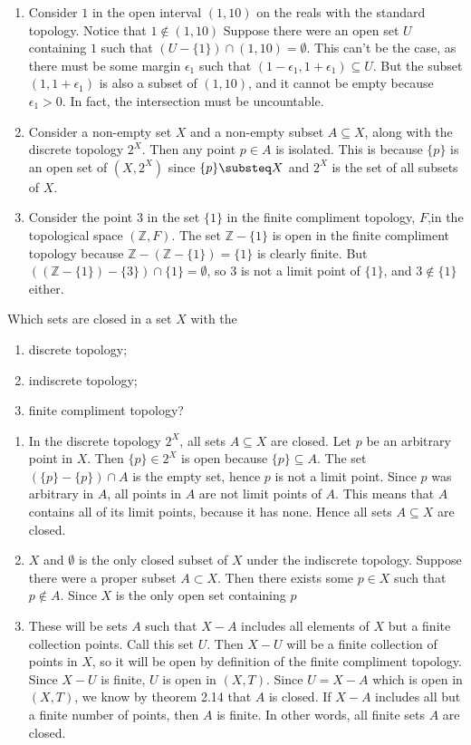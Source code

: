 \documentclass{article}
\theoremstyle{definition}
\newcommand{\Z}{\mathbb{Z}}
\begin{document}
\begin{enumerate}
    \item Consider $1$ in the open interval $(1,10)$ on the reals with the standard topology. Notice that $1\not \in (1,10)$ Suppose there were an open set $U$ containing $1$ such that $(U - \{1\})\cap (1,10) = \emptyset$. This can't be the case, as there must be some margin $\epsilon_1$ such that $(1-\epsilon_1 , 1 + \epsilon_1)\subseteq U$. But the subset $(1,1 + \epsilon_1)$ is also a subset of $(1,10)$, and it cannot be empty because $\epsilon_1 > 0$. In fact, the intersection must be uncountable.
    \item Consider a non-empty set $X$ and a non-empty subset $A\subseteq X$, along with the discrete topology $2^X$. Then any point $p\in A$ is isolated. This is because $\{p\}$ is an open set of $(X,2^X)$ since $\{p\}\substeq X$ and $2^X$ is the set of all subsets of $X$.
    \item Consider the point $3$ in the set $\{1\} $ in the finite compliment topology, $F$,in the topological space $(\Z, F)$. The set $\Z- \{1\}$ is open in the finite compliment topology because $\Z - (\Z-\{1\}) = \{1\}$ is clearly finite. But $((\Z- \{1\}) - \{3\} )\cap \{1\} = \emptyset$, so 3 is not a limit point of $\{1\}$, and $3\not \in \{1\}$ either.
\end{enumerate}


 Which sets are closed in a set $X$ with the
\begin{enumerate}
    \item discrete topology;
    \item indiscrete topology;
    \item finite compliment topology?
\end{enumerate}

\begin{enumerate}
    \item In the discrete topology $2^X$, all sets $A\subseteq X$ are closed. Let $p$ be an arbitrary point in $X$. Then $\{p\}\in 2^X$ is open because $\{p\}\subseteq A$. The set $(\{p\} - \{p\})\cap A$ is the empty set, hence $p$ is not a limit point. Since $p$ was arbitrary in $A$, all points in $A$ are not limit points of $A$. This means that $A$ contains all of its limit points, because it has none. Hence all sets $A\subseteq X$ are closed.
    \item $X$ and $\emptyset$ is the only closed subset of $X$ under the indiscrete topology. Suppose there were a proper subset $A\subset X$. Then there exists some $p\in X$ such that $p\not \in A$. Since $X$ is the only open set containing $p$ 
    \item These will be sets $A$ such that $X-A$ includes all elements of $X$ but a finite collection points. Call this set $U$. Then $X-U$ will be a finite collection of points in $X$, so it will be open by definition of the finite compliment topology. Since $X-U$ is finite, $U$ is open in $(X,T)$. Since $U = X-A$ which is open in $(X,T)$, we know by theorem 2.14 that $A$ is closed. If $X-A$ includes all but a finite number of points, then $A$ is finite. In other words, all finite sets $A$ are closed. 
\end{enumerate}
\end{document}
